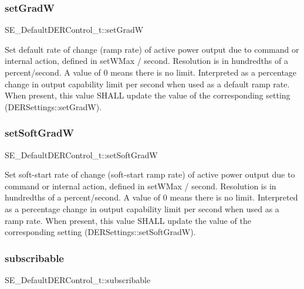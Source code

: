 \subsubsection{\texorpdfstring{set\+GradW}{setGradW}}
{\footnotesize\ttfamily S\+E\+\_\+\+Default\+D\+E\+R\+Control\+\_\+t\+::set\+GradW}

Set default rate of change (ramp rate) of active power output due to command or internal action, defined in set\+W\+Max / second. Resolution is in hundredths of a percent/second. A value of 0 means there is no limit. Interpreted as a percentage change in output capability limit per second when used as a default ramp rate. When present, this value S\+H\+A\+LL update the value of the corresponding setting (D\+E\+R\+Settings\+::set\+GradW). \mbox{\label{group__DefaultDERControl_gae2bf2188e38848f18c748c1b540d3429}} 
\subsubsection{\texorpdfstring{set\+Soft\+GradW}{setSoftGradW}}
{\footnotesize\ttfamily S\+E\+\_\+\+Default\+D\+E\+R\+Control\+\_\+t\+::set\+Soft\+GradW}

Set soft-\/start rate of change (soft-\/start ramp rate) of active power output due to command or internal action, defined in set\+W\+Max / second. Resolution is in hundredths of a percent/second. A value of 0 means there is no limit. Interpreted as a percentage change in output capability limit per second when used as a ramp rate. When present, this value S\+H\+A\+LL update the value of the corresponding setting (D\+E\+R\+Settings\+::set\+Soft\+GradW). \mbox{\label{group__DefaultDERControl_gaa16d98b386c11e56b2fde9a1c3c35847}} 
\subsubsection{\texorpdfstring{subscribable}{subscribable}}
{\footnotesize\ttfamily S\+E\+\_\+\+Default\+D\+E\+R\+Control\+\_\+t\+::subscribable}

